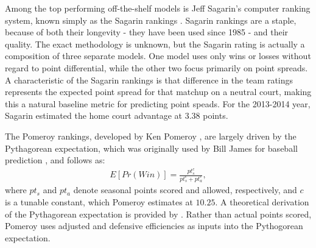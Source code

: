 \documentclass[letterpaper,12pt]{article}
\begin{document}
Among the top performing off-the-shelf models is Jeff Sagarin's computer ranking system, known simply as the Sagarin rankings \citep{sagarin}. Sagarin rankings are a staple, because of both their longevity  - they have been used since 1985 - and their quality. The exact methodology is unknown, but the Sagarin rating is actually a composition of three separate models. One model uses only wins or losses without regard to point differential, while the other two focus primarily on point spreads. A characteristic of the Sagarin rankings is that difference in the team ratings represents the expected point spread for that matchup on a neutral court, making this a natural baseline metric for predicting point speads. For the 2013-2014 year, Sagarin estimated the  home court advantage at 3.38 points.

The Pomeroy rankings, developed by Ken Pomeroy \citep{kenpom.com}, are largely driven by the Pythagorean expectation, which was originally used by Bill James for baseball prediction \citep{james}, and follows as:
\begin{eqnarray}
E[Pr(Win)] = \frac{pt_s^c}{pt_s^c + pt_a^c},
\end{eqnarray}
where $pt_s$ and $pt_a$ denote seasonal points scored and allowed, respectively, and $c$ is a tunable constant, which Pomeroy estimates at $10.25$.  
A theoretical derivation of the Pythagorean expectation is provided by \cite{miller2007}.
Rather than actual points scored, Pomeroy uses adjusted and defensive efficiencies as inputs into the Pythogorean expectation.
\end{document}
